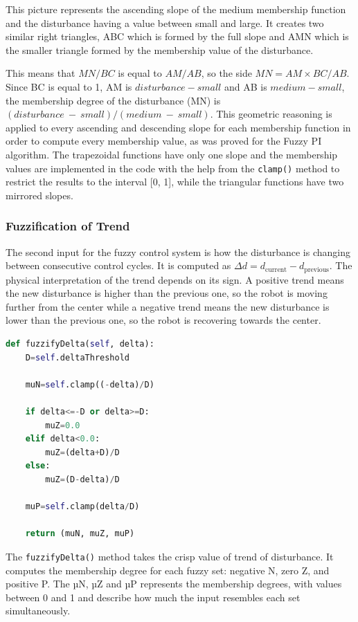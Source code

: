 This picture represents the ascending slope of the medium membership function and the disturbance having a value between small and large. It creates two similar right triangles, ABC which is formed by the full slope and AMN which is the smaller triangle formed by the membership value of the disturbance. 

This means that $MN/BC$ is equal to $AM/AB$, so the side $MN = AM \times BC / AB$. Since BC is equal to 1, AM is $disturbance - small$ and AB is $medium - small$, the membership degree of the disturbance (MN) is $(disturbance\ -\ small)/(medium\ -\ small)$. This geometric reasoning is applied to every ascending and descending slope for each membership function in order to compute every membership value, as was proved for the Fuzzy PI algorithm. The trapezoidal functions have only one slope and the membership values are implemented in the code with the help from the \texttt{clamp()} method to restrict the results to the interval [0, 1], while the triangular functions have two mirrored slopes. 

\subsubsection{Fuzzification of Trend}

The second input for the fuzzy control system is how the disturbance is changing between consecutive control cycles. It is computed as $\Delta d = d_{\text{current}} - d_{\text{previous}}$. The physical interpretation of the trend depends on its sign. A positive trend means the new disturbance is higher than the previous one, so the robot is moving further from the center while a negative trend means the new disturbance is lower than the previous one, so the robot is recovering towards the center.

\begin{lstlisting}[language=Python, caption={FuzzyRuleBasedAlgorithm trend fuzzyfication}, label={lst:lk-init}]
def fuzzifyDelta(self, delta):
    D=self.deltaThreshold
    
    muN=self.clamp((-delta)/D)
    
    if delta<=-D or delta>=D:
        muZ=0.0
    elif delta<0.0:
        muZ=(delta+D)/D
    else:
        muZ=(D-delta)/D    
        
    muP=self.clamp(delta/D)
    
    return (muN, muZ, muP)
\end{lstlisting}

The \texttt{fuzzifyDelta()} method takes the crisp value of trend of disturbance. It computes the membership degree for each fuzzy set: negative N, zero Z, and positive P. The µN, µZ and µP represents the membership degrees, with values between 0 and 1 and describe how much the input resembles each set simultaneously. 

